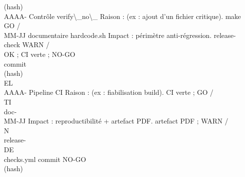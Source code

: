 \documentclass[12pt,landscape,a4paper]{article}
\begin{document}
(hash)\\
AAAA-          Contrôle     verify\textbackslash{}_no\textbackslash{}_                     Raison : (ex : ajout d’un fichier critique).                                                  make            GO /\\
MM-JJ          documentaire hardcode.sh                    Impact : périmètre anti-régression.                                                           release-check WARN /\\
OK ; CI verte ; NO-GO\\
commit\\
(hash)\\
\vspace{0.5em}
\vspace{0.5em}
\vspace{0.5em}
\vspace{0.5em}
EL\\
AAAA-          Pipeline CI                                 Raison : (ex : fiabilisation build).                                                          CI verte ;     GO /\\
\vspace{0.5em}
\vspace{0.5em}
\vspace{0.5em}
\vspace{0.5em}
TI\\
doc-\\
MM-JJ                                                      Impact : reproductibilité + artefact PDF.                                                     artefact PDF ; WARN /\\
\vspace{0.5em}
\vspace{0.5em}
\vspace{0.5em}
\vspace{0.5em}
N\\
release-\\
\vspace{0.5em}
\vspace{0.5em}
\vspace{0.5em}
\vspace{0.5em}
DE\\
checks.yml                                                                                                          commit         NO-GO\\
(hash)\\
\vspace{0.5em}
\vspace{0.5em}
\end{document}

